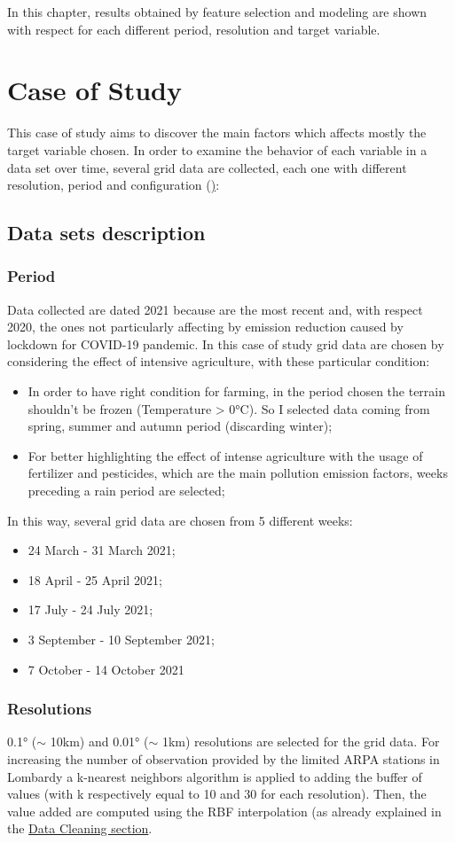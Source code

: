 In this chapter, results obtained by feature selection and modeling are shown with respect for each different period, resolution and target variable. 

\section{Case of Study}
This case of study aims to discover the main factors which affects mostly the target variable chosen. In order to examine the behavior of each variable in a data set over time, several grid data are collected, each one with different resolution, period and configuration (\href{fig:test_params}):
\subsection{Data sets description}
\subsubsection{Period}  
Data collected are dated 2021 because are the most recent and, with respect 2020, the ones not particularly affecting by emission reduction caused by lockdown for COVID-19 pandemic\cite{bontempi2022analysis}. In this case of study grid data are chosen by considering the effect of intensive agriculture, with these particular condition:
    \begin{itemize}
        \item In order to have right condition for farming, in the period chosen the terrain shouldn't be frozen (Temperature > 0°C). So I selected data coming from spring, summer and autumn period (discarding winter);
        \item For better highlighting the effect of intense agriculture with the usage of fertilizer and pesticides, which are the main pollution emission factors, weeks preceding a rain period are selected;
\end{itemize}
In this way, several grid data are chosen from 5 different weeks:
\begin{itemize}
    \item 24 March - 31 March 2021;
    \item 18 April - 25 April 2021;
    \item 17 July - 24 July 2021;
    \item 3 September - 10 September 2021;
    \item 7 October - 14 October 2021
\end{itemize}
\subsubsection{Resolutions}
0.1° ($\sim$ 10km) and 0.01° ($\sim$ 1km) resolutions are selected for the grid data. For increasing the number of observation provided by the limited ARPA stations in Lombardy a k-nearest neighbors algorithm is applied to adding the buffer of values (with k respectively equal to 10 and 30 for each resolution). Then, the value added are computed using the RBF interpolation (as already explained in the \hyperref[sec:Data cleaning]{Data Cleaning section}.

